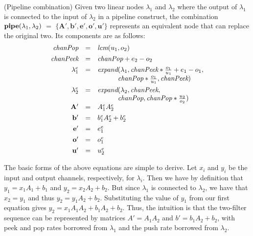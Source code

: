 \begin{transformation} (Pipeline combination)
Given two linear nodes $\lambda_1$ and $\lambda_2$ where the output of
$\lambda_1$ is connected to the input of $\lambda_2$ in a pipeline
construct, the combination $\mbox{\bf pipe}(\lambda_1, \lambda_2)$ $=$
$\mathbf{ \{A', b', e', o', u'\}}$ represents an equivalent node that
can replace the original two.  Its components are as follows:
\begin{equation} \nonumber
\begin{array}{rcl}
\mt{chanPop} & = & \mt{lcm}(u_1, o_2) \\ ~ \vspace{-8pt} \\
\mt{chanPeek} & = & \mt{chanPop} + e_2 - o_2 \\ ~ \vspace{-8pt} \\
\lambda_1^e & = & \mt{expand}(\lambda_1, \mt{chanPeek} * \frac{o_1}{u_1} + e_1 - o_1, \\
~ & ~ & ~\hspace{0.32in}~ \mt{chanPop} * \frac{o_1}{u_1}, \mt{chanPeek}) \\ ~ \vspace{-8pt} \\
\lambda_2^e & = & \mt{expand}(\lambda_2, \mt{chanPeek}, \\
~ & ~ & ~\hspace{0.32in}~ \mt{chanPop}, \mt{chanPop} * \frac{u_2}{o_2}) \\
\mathbf{A'} & = & A_1^e A_2^e \\ ~ \vspace{-8pt} \\
\mathbf{b'} & = & b_1^e A_2^e + b_2^e \\ ~ \vspace{-8pt} \\
\mathbf{e'} & = & e_1^e \\ ~ \vspace{-8pt} \\
\mathbf{o'} & = & o_1^e \\ ~ \vspace{-8pt} \\
\mathbf{u'} & = & u_2^e
\end{array}
\end{equation}
\end{transformation}

The basic forms of the above equations are simple to derive.  Let
$x_i$ and $y_i$ be the input and output channels, respectively, for
$\lambda_i$.  Then we have by definition that $y_1 = x_1 A_1 + b_1$
and $y_2 = x_2 A_2 + b_2$.  But since $\lambda_1$ is connected to
$\lambda_2$, we have that $x_2 = y_1$ and thus $y_2 = y_1 A_2 + b_2$.
Substituting the value of $y_1$ from our first equation gives $y_2 =
x_1 A_1 A_2 + b_1 A_2 + b_2$.  Thus, the intuition is that the
two-filter sequence can be represented by matrices $A' = A_1 A_2$
and $b' = b_1 A_2 + b_2$, with peek and pop rates borrowed from
$\lambda_1$ and the push rate borrowed from $\lambda_2$.

